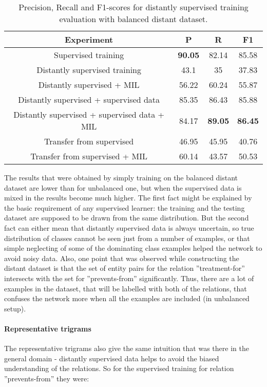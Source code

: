 \begin{table}[h]
  \begin{center}
 \begin{tabular}{ | c | c | c | c | }
    \hline
    Experiment & P & R & F1 \\ \hline
    Supervised training & \textbf{90.05} & 82.14 & 85.58 \\ \hline
    Distantly supervised training & 43.1 & 35 & 37.83 \\ \hline
    Distantly supervised + MIL & 56.22 & 60.24 & 55.87  \\ \hline
    Distantly supervised + supervised data & 85.35 & 86.43 & 85.88 \\ \hline
    Distantly supervised + supervised data + MIL & 84.17 & \textbf{89.05} & \textbf{86.45} \\ \hline
    Transfer from supervised & 46.95 & 45.95 & 40.76 \\ \hline
    Transfer from supervised + MIL & 60.14 & 43.57 & 50.53 \\ \hline
    \end{tabular}
\caption[Medical domain, Distant Supervision with balancing experiments results]{Precision, Recall and F1-scores for distantly supervised training evaluation with balanced distant dataset.}
\label{tab:dist-med-res-bal}
\end{center}
\end{table}

The results that were obtained by simply training on the balanced distant dataset are lower than for  
unbalanced one, but when the supervised data is mixed in the results become much higher. The first 
fact might be explained by the basic requirement of any supervised learner: the training and 
the testing dataset are supposed to be drawn from the same distribution. But the second fact can either mean that distantly 
supervised data is always uncertain, so true distribution of classes cannot be seen just from a number
 of examples, or that simple neglecting of some of the dominating class examples 
helped the network to avoid noisy data. Also, one point that was observed while constructing the distant dataset
is that the set of entity pairs for the relation ''treatment-for'' intersects with the set for ''prevents-from'' significantly.
Thus, there are a lot of examples in the dataset, that will be labelled with both of the relations, that confuses 
the network more when all the examples are included (in unbalanced setup). 

\paragraph{Representative trigrams} 
The representative trigrams also give the same intuition that was there in the general domain - 
distantly supervised data helps to avoid the biased understanding of the relations. So for the 
supervised training for relation ''prevents-from'' they were:

